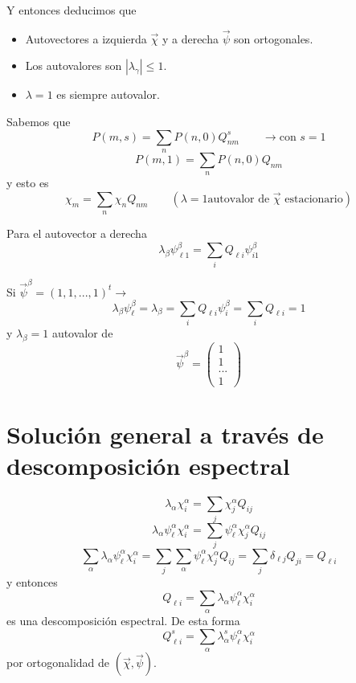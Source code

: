 \documentclass[10pt,oneside]{CBFT_book}
\begin{document}
Y entonces deducimos que 
\begin{itemize}
 \item Autovectores a izquierda $\vec{\chi}$ y a derecha $\vec{\psi}$ son ortogonales.
 \item Los autovalores son $|\lambda_\gamma|\leq 1$.
 \item $\lambda = 1$ es siempre autovalor.
\end{itemize}

Sabemos que 
\[
	P(m,s) = \sum_n P(n,0) Q^s_{nm} \qquad \rightarrow \text{con $s=1$}
\]
\[
	P(m,1) = \sum_n P(n,0) Q_{nm}
\]
y esto es 
\[
	\chi_m = \sum_n \chi_n Q_{nm}  \qquad (\lambda=1 \text{autovalor de $\vec{\chi}$ 
estacionario})
\]

Para el autovector a derecha 
\[
	\lambda_\beta \psi_{\ell 1}^\beta = \sum_i Q_{\ell i} \psi_{i1}^\beta
\]

Si $ \vec{\psi}^\beta = (1,1,...,1)^t\rightarrow$
\[
	\lambda_\beta \psi_\ell^\beta = \lambda_\beta = \sum_i Q_{\ell i} \psi_i^\beta
	= \sum_i Q_{\ell i} = 1
\]
y $\lambda_\beta=1$ autovalor de 
\[
	\vec{\psi}^\beta = \begin{pmatrix}
	 1\\
	 1\\
	 ...\\
	 1
	\end{pmatrix}
\]

\section{Solución general a través de descomposición espectral}

\[
	\lambda_\alpha \chi_i^\alpha = \sum_j \chi_j^\alpha Q_{ij} 
\]
\[
	\lambda_\alpha \psi_\ell^\alpha \chi_i^\alpha = \sum_j \psi_\ell^\alpha\chi_j^\alpha Q_{ij} 
\]
\[
	\sum_\alpha \lambda_\alpha \psi_\ell^\alpha \chi_i^\alpha = 
	\sum_j \sum_\alpha \psi_\ell^\alpha\chi_j^\alpha Q_{ij} =
	\sum_j \delta_{\ell j} Q_{ji} = Q_{\ell i}
\]
y entonces 
\[
	Q_{\ell i} = \sum_\alpha \lambda_\alpha \psi_\ell^\alpha \chi_i^\alpha
\]
es una descomposición espectral.
De esta forma 
\[
	Q_{\ell i}^s = \sum_\alpha \lambda_\alpha^s \psi_\ell^\alpha \chi_i^\alpha
\]
por ortogonalidad de $( \vec{\chi}, \vec{\psi} )$.
\end{document}
